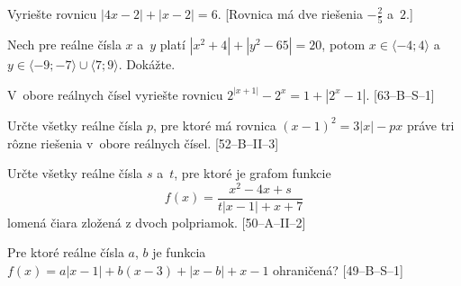 {
Vyriešte rovnicu $|4x-2|+|x-2|=6$. [Rovnica má dve riešenia $-\frac25$ a~$2$.]

Nech pre reálne čísla $x$ a~$y$ platí $|x^2+4|+|y^2-65|=20$, potom $x\in\langle
{-4};4\rangle$ a~$y\in\langle{-9};{-7}\rangle\cup\langle7;9\rangle$. Dokážte.

V~obore reálnych čísel vyriešte rovnicu $2^{|x+1|}-2^x =1+|2^x-1|$. [63--B--S--1]

\D
Určte všetky reálne čísla $p$, pre ktoré má rovnica
$(x-1)^2=3|x|-px$
práve tri rôzne riešenia v~obore reálnych čísel.
[52--B--II--3]

Určte všetky reálne čísla $s$ a~$t$, pre ktoré je grafom funkcie
$$f(x)=\dfrac{x^2-4x+s}{t|x-1|+x+7}$$
lomená čiara zložená z dvoch polpriamok.
[50--A--II--2]

Pre ktoré reálne čísla $a$, $b$ je funkcia
$f(x) = a|x-1|+b(x-3)+|x-b|+x-1$
ohraničená?
[49--B--S--1]
}

